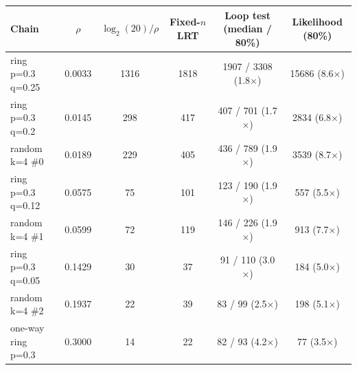 \begin{tabular}{lccccc}
\toprule
Chain & $\rho$ & $\log_2(20)/\rho$ & Fixed-$n$ LRT & Loop test (median / 80\%) & Likelihood (80\%) \\
\midrule
ring p=0.3 q=0.25 & 0.0033 & 1316 & 1818 & 1907 / 3308 (1.8$\times$) & 15686 (8.6$\times$) \\
ring p=0.3 q=0.2 & 0.0145 & 298 & 417 & 407 / 701 (1.7$\times$) & 2834 (6.8$\times$) \\
random k=4 \#0 & 0.0189 & 229 & 405 & 436 / 789 (1.9$\times$) & 3539 (8.7$\times$) \\
ring p=0.3 q=0.12 & 0.0575 & 75 & 101 & 123 / 190 (1.9$\times$) & 557 (5.5$\times$) \\
random k=4 \#1 & 0.0599 & 72 & 119 & 146 / 226 (1.9$\times$) & 913 (7.7$\times$) \\
ring p=0.3 q=0.05 & 0.1429 & 30 & 37 & 91 / 110 (3.0$\times$) & 184 (5.0$\times$) \\
random k=4 \#2 & 0.1937 & 22 & 39 & 83 / 99 (2.5$\times$) & 198 (5.1$\times$) \\
one-way ring p=0.3 & 0.3000 & 14 & 22 & 82 / 93 (4.2$\times$) & 77 (3.5$\times$) \\
\bottomrule
\end{tabular}
